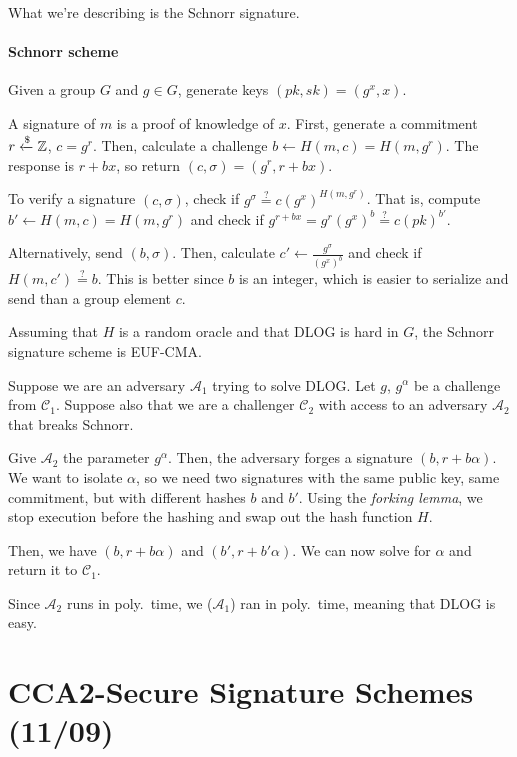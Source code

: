 \documentclass[notes]{agony}
\newcommand{\xgets}{\xleftarrow}
\begin{document}
What we're describing is the Schnorr signature.

\paragraph{Schnorr scheme}
Given a group $G$ and $g \in G$,
generate keys $(pk, sk) = (g^x, x)$.

A signature of $m$ is a proof of knowledge of $x$.
First, generate a commitment $r \xgets{\$} \Z$, $c = g^r$.
Then, calculate a challenge $b \gets H(m,c) = H(m,g^r)$.
The response is $r+bx$, so return $(c, \sigma) = (g^r, r+bx)$.

To verify a signature $(c, \sigma)$,
check if $g^\sigma \stackrel{?}{=} c(g^x)^{H(m, g^r)}$.
That is, compute $b' \gets H(m, c) = H(m, g^r)$
and check if $g^{r+bx} = g^r (g^x)^b \stackrel{?}{=} c(pk)^{b'}$.

Alternatively, send $(b, \sigma)$.
Then, calculate $c' \gets \frac{g^\sigma}{(g^x)^b}$
and check if $H(m, c') \stackrel{?}{=} b$.
This is better since $b$ is an integer,
which is easier to serialize and send than a group element $c$.

\begin{theorem}[Schnorr]
  Assuming that $H$ is a random oracle and that DLOG is hard in $G$,
  the Schnorr signature scheme is EUF-CMA.
\end{theorem}
\begin{prf}
  Suppose we are an adversary $\mathcal A_1$ trying to solve DLOG.
  Let $g$, $g^\alpha$ be a challenge from $\mathcal C_1$.
  Suppose also that we are a challenger $\mathcal C_2$
  with access to an adversary $\mathcal A_2$ that breaks Schnorr.

  Give $\mathcal A_2$ the parameter $g^\alpha$.
  Then, the adversary forges a signature $(b, r + b\alpha)$.
  We want to isolate $\alpha$, so we need two signatures
  with the same public key, same commitment, but with different hashes $b$ and $b'$.
  Using the \emph{forking lemma}, we stop execution before the hashing
  and swap out the hash function $H$.

  Then, we have $(b, r + b\alpha)$ and $(b', r + b'\alpha)$.
  We can now solve for $\alpha$ and return it to $\mathcal C_1$.

  Since $\mathcal A_2$ runs in poly.\ time,
  we ($\mathcal A_1$) ran in poly.\ time,
  meaning that DLOG is easy.
\end{prf}

\section{CCA2-Secure Signature Schemes (11/09)}
\end{document}
